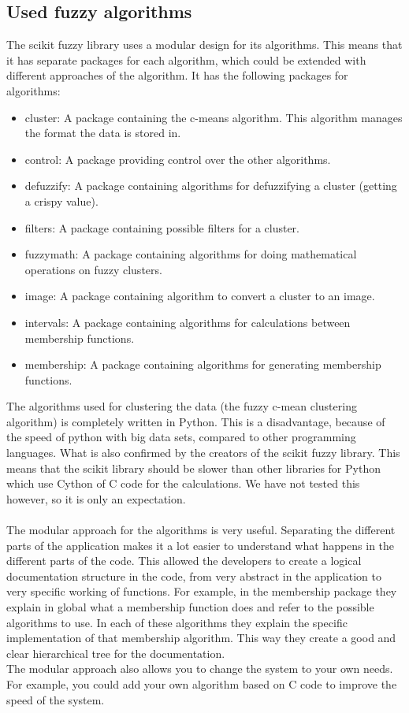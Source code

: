 \documentclass[fleqn,10pt]{SelfArx} %
\begin{document}
\subsection{Used fuzzy algorithms}
The scikit fuzzy library uses a modular design for its algorithms. This means that it has separate packages for each algorithm, which could be extended with different approaches of the algorithm. It has the following packages for algorithms:
\begin{itemize}
    \item cluster: A package containing the c-means algorithm. This algorithm manages the format the data is stored in. 
    \item control: A package providing control over the other algorithms.
    \item defuzzify: A package containing algorithms for defuzzifying a cluster (getting a crispy value).
    \item filters: A package containing possible filters for a cluster.
    \item fuzzymath: A package containing algorithms for doing mathematical operations on fuzzy clusters.
    \item image: A package containing algorithm to convert a cluster to an image.
    \item intervals: A package containing algorithms for calculations between membership functions.
    \item membership: A package containing algorithms for generating membership functions. 
\end{itemize}
The algorithms used for clustering the data (the fuzzy c-mean clustering algorithm) is completely written in Python. This is a disadvantage, because of the speed of python with big data sets, compared to other programming languages. \cite{Benchmark} What is also confirmed by the creators of the scikit fuzzy library. \cite{SciPy} This means that the scikit library should be slower than other libraries for Python which use Cython of C code for the calculations. We have not tested this however, so it is only an expectation.\\ \\

The modular approach for the algorithms is very useful. Separating the different parts of the application makes it a lot easier to understand what happens in the different parts of the code. This allowed the developers to create a logical documentation structure in the code, from very abstract in the application to very specific working of functions. For example, in the membership package they explain in global what a membership function does and refer to the possible algorithms to use. In each of these algorithms they explain the specific implementation of that membership algorithm. This way they create a good and clear hierarchical tree for the documentation. \\  
The modular approach also allows you to change the system to your own needs. For example, you could add your own algorithm based on C code to improve the speed of the system.
\end{document}
